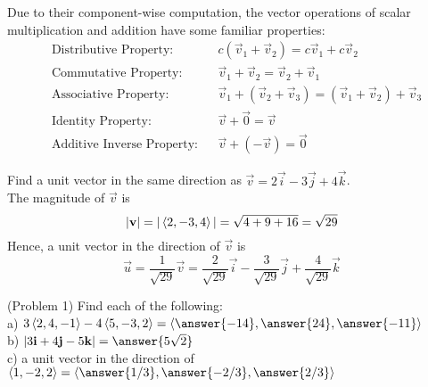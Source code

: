 \documentclass[handout]{ximera}
\begin{document}
Due to their component-wise computation, the vector operations of scalar multiplication and addition have some familiar properties:
\begin{align*}
&\text{Distributive Property:} & &c(\vec{v}_1 + \vec{v}_2) = c\vec{v}_1 + c\vec{v}_2   \\
& \text{Commutative Property:}& &\vec{v}_1 + \vec{v}_2 = \vec{v}_2 + \vec{v}_1 \\
& \text{Associative Property:}&  &\vec{v}_1 + (\vec{v}_2+ \vec{v}_3) =  (\vec{v}_1 + \vec{v}_2) + \vec{v}_3 \\
&\text{Identity Property:} & &\vec{v} + \vec{0} = \vec{v} \\
& \text{Additive Inverse Property:} & &\vec{v} + (-\vec{v}) = \vec{0} 
\end{align*}

\begin{example}[Example 1]
Find a unit vector in the same direction as $\vec{v} = 2 \vec{i} - 3\vec{j} + 4\vec{k}$.\\
The magnitude of $\vec{v}$ is
\[
|\mathbf{v}| = |\left\langle 2, -3, 4\right\rangle| = \sqrt{4+9+16} = \sqrt{29}
\]
Hence, a unit vector in the direction of $\vec{v}$ is
\[
\vec{u} = \frac{1}{\sqrt{29}}\vec{v} = \frac{2}{\sqrt{29}}\vec{i} - \frac{3}{\sqrt{29}}\vec{j} + \frac{4}{\sqrt{29}}\vec{k}
\]
\end{example}

\begin{problem}(Problem 1)
Find each of the following:\\
a) $3\vector{2, 4, -1} - 4\vector{5, -3, 2} = \vector{\answer{-14}, \answer{24}, \answer{-11}}$\\
b) $|3\vec{i} + 4\vec{j}- 5\vec{k}| = \answer{5\sqrt{2}}$\\
c) a unit vector in the direction of $\vector{1, -2, 2} = \vector{\answer{1/3}, \answer{-2/3}, \answer{2/3}}$
\end{problem}
\end{document}
